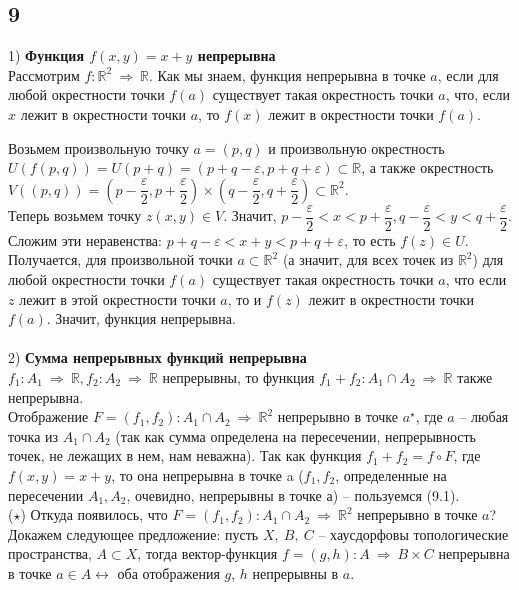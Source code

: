		\subsection{9}
		1) \textbf{Функция $f(x, y) = x + y$ непрерывна}
		\\
		Рассмотрим $f: \mathbb{R}^2 \ \Rightarrow \ \mathbb{R}$. Как мы знаем, функция непрерывна в точке $a$, если для любой окрестности точки $f(a)$ существует такая окрестность точки $a$, что, если $x$ лежит в окрестности точки $a$, то $f(x)$ лежит в окрестности точки $f(a)$. 
		
		Возьмем произвольную точку $a = (p, q)$ и произвольную окрестность $U(f(p, q)) = U(p + q) = (p + q - \varepsilon, p + q + \varepsilon) \subset \mathbb{R}$, а также окрестность $V((p, q)) = (p - \dfrac{\varepsilon}{2}, p + \dfrac{\varepsilon}{2}) \times (q - \dfrac{\varepsilon}{2}, q + \dfrac{\varepsilon}{2}) \subset \mathbb{R}^2$. 
		\\
		Теперь возьмем точку $z(x, y) \in V$. Значит, $p - \dfrac{\varepsilon}{2} < x < p + \dfrac{\varepsilon}{2}, q - \dfrac{\varepsilon}{2} < y < q + \dfrac{\varepsilon}{2}$. Сложим эти неравенства: $p + q - \varepsilon < x + y < p + q + \varepsilon$, то есть $f(z) \in U$. 
		\\
		Получается, для произвольной точки $a \subset \mathbb{R}^2$ (а значит, для всех точек из $\mathbb{R}^2$) для любой окрестности точки $f(a)$ существует такая окрестность точки $a$, что если $z$ лежит в этой окрестности точки $a$, то и $f(z)$ лежит в окрестности точки $f(a)$. Значит, функция непрерывна. 
		\\ \\
		2) \textbf{Сумма непрерывных функций непрерывна}
		\\
		$f_1: A_1 \ \Rightarrow \ \mathbb{R}, f_2: A_2 \ \Rightarrow \ \mathbb{R}$ непрерывны, то функция $f_1 + f_2: A_1 \cap A_2 \ \Rightarrow \ \mathbb{R}$ также непрерывна. 
		\\
		Отображение $F = (f_1, f_2): A_1 \cap A_2 \ \Rightarrow \ \mathbb{R}^2$ непрерывно в точке $a^{\star}$, где $a$ -- любая точка из $A_1 \cap A_2$ (так как сумма определена на пересечении, непрерывность точек, не лежащих в нем, нам неважна). Так как функция $f_1 + f_2 = f \circ F$, где $f(x, y) = x + y$, то она непрерывна в точке a ($f_1, f_2$, определенные на пересечении $A_1, A_2$, очевидно, непрерывны в точке $а$) -- пользуемся (9.1). 
		\\
		($\star$) Откуда появилось, что $F = (f_1, f_2): A_1 \cap A_2 \ \Rightarrow \ \mathbb{R}^2$ непрерывно в точке $a$? Докажем следующее предложение: пусть $X,\ B,\ C$ -- хаусдорфовы топологические пространства, $A \subset X$, тогда вектор-функция $f = (g, h): A \ \Rightarrow \ B \times C$ непрерывна в точке $a \in A \leftrightarrow$ оба отображения $g$, $h$ непрерывны в $a$. 
		
